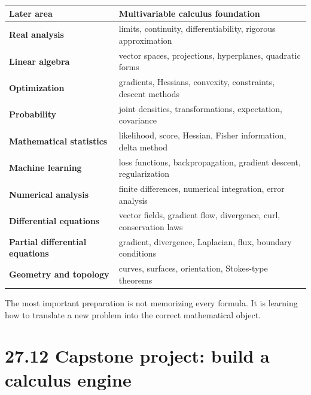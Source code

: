 \documentclass[11pt]{article}
\begin{document}
\begin{center}
\renewcommand{\arraystretch}{1.12}
\begin{tabularx}{\textwidth}{>{\bfseries}p{}X}
\toprule
Later area & Multivariable calculus foundation\\
\midrule
Real analysis & limits, continuity, differentiability, rigorous approximation\\
Linear algebra & vector spaces, projections, hyperplanes, quadratic forms\\
Optimization & gradients, Hessians, convexity, constraints, descent methods\\
Probability & joint densities, transformations, expectation, covariance\\
Mathematical statistics & likelihood, score, Hessian, Fisher information, delta method\\
Machine learning & loss functions, backpropagation, gradient descent, regularization\\
Numerical analysis & finite differences, numerical integration, error analysis\\
Differential equations & vector fields, gradient flow, divergence, curl, conservation laws\\
Partial differential equations & gradient, divergence, Laplacian, flux, boundary conditions\\
Geometry and topology & curves, surfaces, orientation, Stokes-type theorems\\
\bottomrule
\end{tabularx}
\end{center}

The most important preparation is not memorizing every formula. It is learning how to translate a new problem into the correct mathematical object.

\section*{27.12 Capstone project: build a calculus engine}
\end{document}
